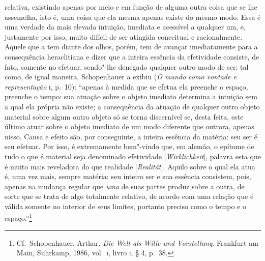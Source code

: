 relativa, existindo apenas por meio e em função de alguma outra coisa
que se lhe assemelha, isto é, uma coisa que ela mesma apenas existe do mesmo
modo. Essa é uma verdade da mais elevada intuição, imediata e
acessível a qualquer um, e, justamente por isso, muito difícil de ser
atingida conceitual e racionalmente. Aquele que a tem diante dos olhos,
porém, tem de avançar imediatamente para a consequência heraclitiana e
dizer que a inteira essência da efetividade consiste, de fato, somente
no efetuar, sendo"-lhe denegado qualquer outro modo de ser; tal como, de
igual maneira, Schopenhauer a exibiu (\textit{O mundo como vontade e
representação} \textsc{i}, p.~10): ``apenas à medida que se efetua ela preenche o
espaço, preenche o tempo: sua atuação sobre o objeto imediato determina
a intuição sem a qual ela própria não existe; a consequência da atuação
de qualquer outro objeto material sobre algum outro objeto só se torna
discernível se, desta feita, este último atuar sobre o objeto imediato
de um modo diferente que outrora, apenas nisso.
Causa e efeito são, por conseguinte, a inteira essência da matéria: seu ser é
seu efetuar. Por isso, é extremamente bem"-vindo que, em alemão, o
epítome de tudo o que é material seja denominado efetividade
[\textit{Wirklichkeit}], palavra esta que é muito mais reveladora do
que realidade [\textit{Realität}]. Aquilo sobre o qual ela atua é, uma
vez mais, sempre matéria: seu inteiro ser e sua essência consistem,
pois, apenas na mudança regular que \textit{uma} de suas partes produz
sobre a outra, de sorte que se trata de algo totalmente relativo, de
acordo com uma relação que é válida somente no interior de seus
limites, portanto preciso como o tempo e o
espaço.''\footnote{ Cf.~Schopenhauer, Arthur. \textit{Die Welt als Wille
und Vorstellung}. Frankfurt am Main, Suhrkamp, 1986, vol.~\textsc{i}, 
livro \textsc{i}, § 4, p.~38.}

